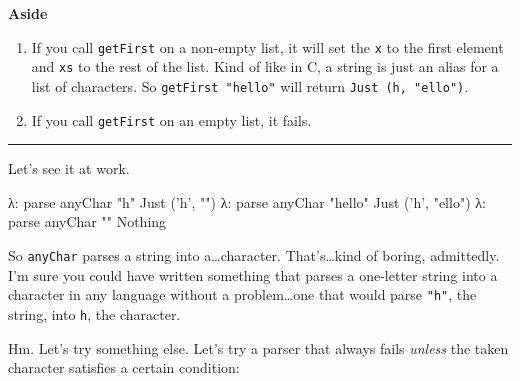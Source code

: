 \documentclass[]{article}
\newenvironment{Shaded}{}{}
\newcommand{\DataTypeTok}[1]{\textcolor[rgb]{0.56,0.13,0.00}{{#1}}}
\newcommand{\CharTok}[1]{\textcolor[rgb]{0.25,0.44,0.63}{{#1}}}
\newcommand{\StringTok}[1]{\textcolor[rgb]{0.25,0.44,0.63}{{#1}}}
\newcommand{\FunctionTok}[1]{\textcolor[rgb]{0.02,0.16,0.49}{{#1}}}
\newcommand{\NormalTok}[1]{{#1}}
\begin{document}
\textbf{Aside}

\begin{enumerate}
\def\labelenumi{\arabic{enumi}.}
\tightlist
\item
  If you call \texttt{getFirst} on a non-empty list, it will set the \texttt{x}
  to the first element and \texttt{xs} to the rest of the list. Kind of like in
  C, a string is just an alias for a list of characters. So
  \texttt{getFirst\ "hello"} will return
  \texttt{Just\ (\textquotesingle{}h\textquotesingle{},\ "ello")}.
\item
  If you call \texttt{getFirst} on an empty list, it fails.
\end{enumerate}

\begin{center}\rule{0.5\linewidth}{\linethickness}\end{center}

Let's see it at work.

\begin{Shaded}
\begin{Highlighting}[]
\NormalTok{λ}\FunctionTok{:} \NormalTok{parse anyChar }\StringTok{"h"}
\DataTypeTok{Just} \NormalTok{(}\CharTok{'h'}\NormalTok{, }\StringTok{""}\NormalTok{)}
\NormalTok{λ}\FunctionTok{:} \NormalTok{parse anyChar }\StringTok{"hello"}
\DataTypeTok{Just} \NormalTok{(}\CharTok{'h'}\NormalTok{, }\StringTok{"ello"}\NormalTok{)}
\NormalTok{λ}\FunctionTok{:} \NormalTok{parse anyChar }\StringTok{""}
\DataTypeTok{Nothing}
\end{Highlighting}
\end{Shaded}

So \texttt{anyChar} parses a string into a\ldots{}character. That's\ldots{}kind
of boring, admittedly. I'm sure you could have written something that parses a
one-letter string into a character in any language without a problem\ldots{}one
that would parse \texttt{"h"}, the string, into
\texttt{\textquotesingle{}h\textquotesingle{}}, the character.

Hm. Let's try something else. Let's try a parser that always fails \emph{unless}
the taken character satisfies a certain condition:
\end{document}
